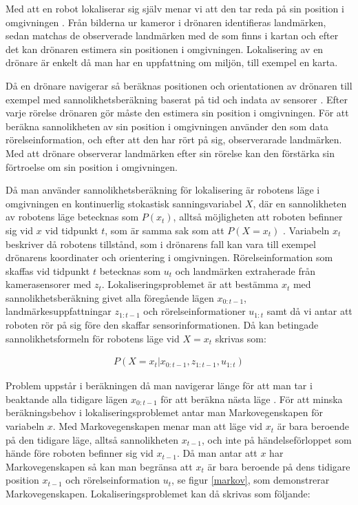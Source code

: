Med att en robot lokaliserar sig själv menar vi att den tar reda på sin position i omgivningen \citep{982903}. Från bilderna ur kameror i drönaren identifieras landmärken, sedan matchas de observerade landmärken med de som finns i kartan och efter det kan drönaren estimera sin positionen i omgivningen. Lokalisering av en drönare är enkelt då man har en uppfattning om miljön, till exempel en karta.

Då en drönare navigerar så beräknas positionen och orientationen av drönaren till exempel med sannolikhetsberäkning baserat på tid och indata av sensorer \citep{ProbabilisticRobotics}. Efter varje rörelse drönaren gör måste den estimera sin position i omgivningen. För att beräkna sannolikheten av sin position i omgivningen använder den som data rörelseinformation, och efter att den har rört på sig, observerarade landmärken. Med att drönare observerar landmärken efter sin rörelse kan den förstärka sin förtroelse om sin position i omgivningen. 

Då man använder sannolikhetsberäkning för lokalisering är robotens läge i omgivningen en kontinuerlig stokastisk sanningsvariabel $X$, där en sannolikheten av robotens läge betecknas som $P(x_t)$, alltså möjligheten att roboten befinner sig vid $x$ vid tidpunkt $t$, som är samma sak som att $P(X = x_t)$ \citep{ProbabilisticRobotics}. Variabeln $x_t$ beskriver då robotens tillstånd, som i drönarens fall kan vara till exempel drönarens koordinater och orientering i omgivningen. Rörelseinformation som skaffas vid tidpunkt $t$ betecknas som $u_t$ och landmärken extraherade från kamerasensorer med $z_t$. Lokaliseringsproblemet är att bestämma $x_t$ med sannolikhetsberäkning givet alla föregående lägen $x_{0:t-1}$, landmärkesuppfattningar $z_{1:t-1}$ och rörelseinformationer $u_{1:t}$ samt då vi antar att roboten rör på sig före den skaffar sensorinformationen. Då kan betingade sannolikhetsformeln för robotens läge vid $X = x_t$ skrivas som:

\begin{align}
    P( X = x_t | x_{0:t-1}, z_{1:t-1}, u_{1:t})
\end{align}

Problem uppstår i beräkningen då man navigerar länge för att man tar i beaktande alla tidigare lägen $x_{0:t-1}$ för att beräkna nästa läge \citep{ProbabilisticRobotics}. För att minska beräkningsbehov i lokaliseringsproblemet antar man Markovegenskapen för variabeln $x$. Med Markovegenskapen menar man att läge vid $x_t$ är bara beroende på den tidigare läge, alltså sannolikheten $x_{t-1}$, och inte på händelseförloppet som hände före roboten befinner sig vid $x_{t-1}$. Då man antar att $x$ har Markovegenskapen så kan man begränsa att $x_t$ är bara beroende på dens tidigare position $x_{t-1}$ och rörelseinformation $u_t$, se figur \ref{markov}, som demonstrerar Markovegenskapen. Lokaliseringsproblemet kan då skrivas som följande:

